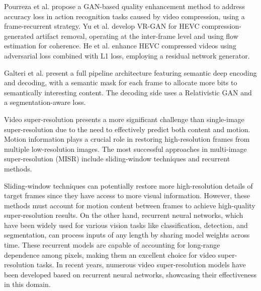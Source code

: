 Pourreza et al. propose a GAN-based quality enhancement method to address accuracy loss in action recognition tasks caused by video compression, using a frame-recurrent strategy. Yu et al. develop VR-GAN for HEVC compression-generated artifact removal, operating at the inter-frame level and using flow estimation for coherence. He et al. enhance HEVC compressed videos using adversarial loss combined with L1 loss, employing a residual network generator.

Galteri et al. present a full pipeline architecture featuring semantic deep encoding and decoding, with a semantic mask for each frame to allocate more bits to semantically interesting content. The decoding side uses a Relativistic GAN and a segmentation-aware loss.

Video super-resolution presents a more significant challenge than single-image super-resolution due to the need to effectively predict both content and motion. Motion information plays a crucial role in restoring high-resolution frames from multiple low-resolution images. The most successful approaches in multi-image super-resolution (MISR) include sliding-window techniques and recurrent methods.

Sliding-window techniques can potentially restore more high-resolution details of target frames since they have access to more visual information. However, these methods must account for motion content between frames to achieve high-quality super-resolution results. On the other hand, recurrent neural networks, which have been widely used for various vision tasks like classification, detection, and segmentation, can process inputs of any length by sharing model weights across time. These recurrent models are capable of accounting for long-range dependence among pixels, making them an excellent choice for video super-resolution tasks. In recent years, numerous video super-resolution models have been developed based on recurrent neural networks, showcasing their effectiveness in this domain.

 

